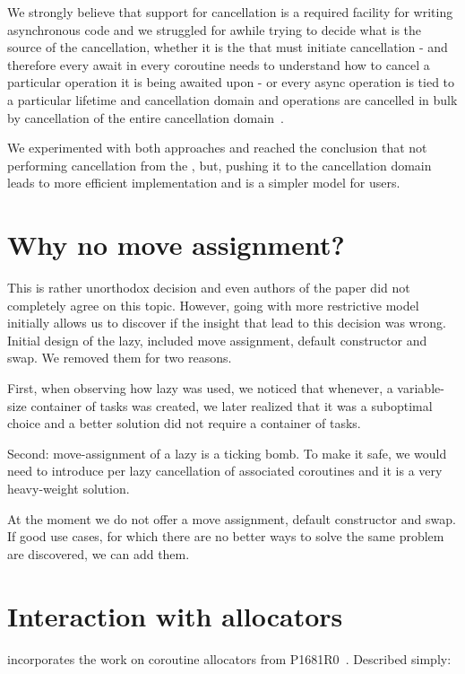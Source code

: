 We strongly believe that support for cancellation is a required facility for writing asynchronous code and we struggled for awhile trying to decide what is the source of the cancellation, whether it is the  that must initiate cancellation - and therefore every await in every coroutine needs to understand how to cancel a particular operation it is being awaited upon - or every async operation is tied to a particular lifetime and cancellation domain and operations are cancelled in bulk by cancellation of the entire cancellation domain~\cite{P0399R0}.

We experimented with both approaches and reached the conclusion that not performing cancellation from the , but, pushing it to the cancellation domain leads to more efficient implementation and is a simpler model for users.

\section{Why no move assignment?}

This is rather unorthodox decision and even authors of the paper did not completely agree on this topic. However, going with more restrictive model initially allows us to discover if the insight that lead to this decision was wrong. Initial design of the lazy, included move assignment, default constructor and swap. We removed them for two reasons.

First, when observing how lazy was used, we noticed that whenever, a variable-size container of tasks was created, we later realized that it was a suboptimal choice and a better solution did not require a container of tasks.

Second: move-assignment of a lazy is a ticking bomb. To make it safe, we would need to introduce per lazy cancellation of associated coroutines and it is a very heavy-weight solution.

At the moment we do not offer a move assignment, default constructor and swap. If good use cases, for which there are no better ways to solve the same problem are discovered, we can add them.

\section{Interaction with allocators}

 incorporates the work on coroutine allocators
from P1681R0~\cite{P1681R0}. Described simply:


